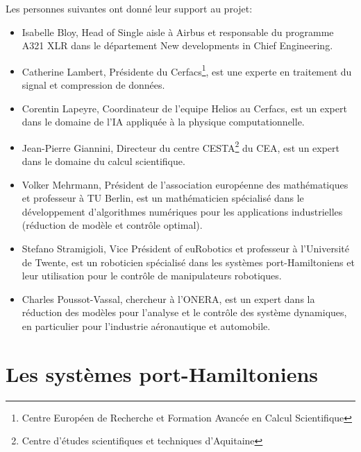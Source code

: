 \documentclass[12pt, french]{article}
\begin{document}
	Les personnes suivantes ont donné leur support au projet:
	\begin{itemize}
		\item Isabelle Bloy, Head of Single aisle  à Airbus et responsable du programme A321 XLR dans le département New developments in Chief Engineering.
		\item Catherine Lambert, Présidente du Cerfacs\footnote{Centre Européen de Recherche et Formation Avancée en Calcul Scientifique}, est une experte en traitement du signal et compression de données. 
		\item Corentin Lapeyre, Coordinateur  de l'equipe Helios au Cerfacs, est un expert dans le domaine de l'IA appliquée à la physique computationnelle.
		\item Jean-Pierre Giannini, Directeur du centre CESTA\footnote{Centre d'études scientifiques et techniques d'Aquitaine} du CEA, est un expert dans le domaine du calcul scientifique.
		\item Volker Mehrmann, Président de l'association européenne des mathématiques et professeur à TU Berlin, est un mathématicien spécialisé dans le développement d'algorithmes numériques pour les applications industrielles (réduction de modèle et contrôle optimal).
		\item Stefano Stramigioli, Vice Président of euRobotics et professeur à l'Université de Twente, est un roboticien spécialisé dans les systèmes port-Hamiltoniens et leur utilisation pour le contrôle de manipulateurs robotiques.
		\item Charles Poussot-Vassal, chercheur à l'ONERA, est un expert dans la réduction des modèles pour l'analyse et le contrôle des système dynamiques, en particulier pour l'industrie aéronautique et automobile.
	\end{itemize}











\section{Les systèmes port-Hamiltoniens}\label{sec:pHreview}
\end{document}
